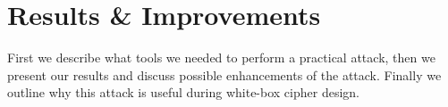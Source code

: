 \chapter{Results \& Improvements}
\label{chap:results}

First we describe what tools we needed to perform a practical attack, then we present our results and discuss possible enhancements of the attack. Finally we outline why this attack is useful during white-box cipher design.










